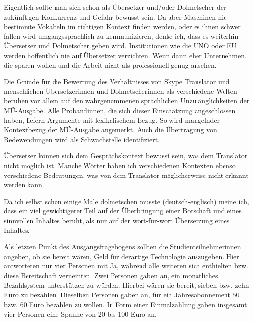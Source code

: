 \begin{example}
	\label{K6:exp:Verhältnis:unterschiede2}
	Eigentlich sollte man sich schon als Übersetzer und/oder Dolmetscher der zukünftigen Konkurrenz und Gefahr bewusst sein. Da aber Maschinen nie bestimmte Vokabeln im richtigen Kontext finden werden, oder es ihnen schwer fallen wird umgangssprachlich zu kommunizieren, denke ich, dass es weiterhin Übersetzer und Dolmetscher geben wird. Institutionen wie die UNO oder EU werden hoffentlich nie auf Übersetzer verzichten. Wenn dann eher Unternehmen, die sparen wollen und die Arbeit nicht als professionell genug ansehen.
\end{example}

Die Gründe für die Bewertung des Verhältnisses von Skype Translator und menschlichen Übersetzer{\textperiodcentered}innen und Dolmetscher{\textperiodcentered}innen als verschiedene Welten beruhen vor allem auf den wahrgenommenen sprachlichen Unzulänglichkeiten der MÜ-Ausgabe. Alle Proband{\textperiodcentered}innen, die sich dieser Einschätzung angeschlossen haben, liefern Argumente mit lexikalischem Bezug. So wird mangelnder Kontextbezug der MÜ-Ausgabe angemerkt. Auch die Übertragung von Redewendungen wird als Schwachstelle identifiziert.

\begin{example}
	\label{K6:exp:Verhältnis:verschWelten}
	Übersetzer können sich dem Gesprächskontext bewusst sein, was dem Translator nicht möglich ist. Manche Wörter haben ich verschiedenen Kontexten ebenso verschiedene Bedeutungen, was von dem Translator möglicherweise nicht erkannt werden kann.
\end{example}

\begin{example}
	\label{K6:exp:Verhältnis:verschWelten2}
	Da ich selbst schon einige Male dolmetschen musste (deutsch-englisch) meine ich, dass ein viel gewichtigerer Teil auf der Überbringung einer Botschaft und eines sinnvollen Inhaltes beruht, als nur auf der wort-für-wort Übersetzung eines Inhaltes.
\end{example}

\begin{sloppypar}
Als letzten Punkt des Ausgangsfragebogens sollten die Studienteilnehmer{\textperiodcentered}\linebreak[3]innen angeben, ob sie bereit wären, Geld für derartige Technologie auszugeben. Hier antworteten nur vier Personen mit Ja, während alle weiteren sich enthielten bzw. diese Bereitschaft verneinten. Zwei Personen gaben an, ein monatliches Bezahlsystem unterstützen zu würden. Hierbei wären sie bereit, sieben bzw. zehn Euro zu bezahlen. Dieselben Personen gaben an, für ein Jahresabonnement 50 bzw. 60 Euro bezahlen zu wollen. In Form einer Einmalzahlung gaben insgesamt vier Personen eine Spanne von 20 bis 100 Euro an.
\end{sloppypar}

